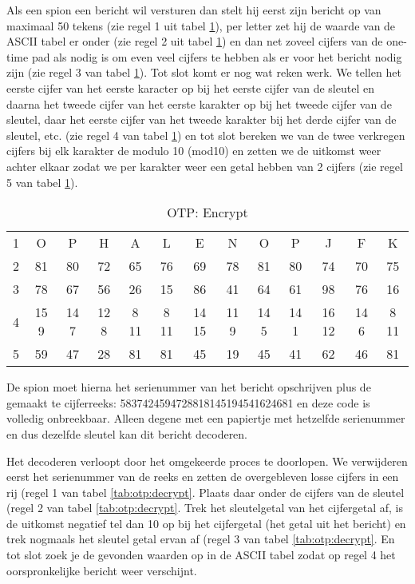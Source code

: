 Als een spion een bericht wil versturen dan stelt hij eerst zijn bericht op van maximaal 50 tekens (zie regel 1 uit tabel \ref{tab:otp:encrypt}), per letter zet hij de waarde van de ASCII tabel er onder (zie regel 2 uit tabel \ref{tab:otp:encrypt}) en dan net zoveel cijfers van de one-time pad als nodig is om even veel cijfers te hebben als er voor het bericht nodig zijn (zie regel 3 van tabel \ref{tab:otp:encrypt}). Tot slot komt er nog wat reken werk. We tellen het eerste cijfer van het eerste karacter op bij het eerste cijfer van de sleutel en daarna het tweede cijfer van het eerste karakter op bij het tweede cijfer van de sleutel, daar het eerste cijfer van het tweede karakter bij het derde cijfer van de sleutel, etc. (zie regel 4 van tabel \ref{tab:otp:encrypt}) en tot slot bereken we van de twee verkregen cijfers bij elk karakter de modulo 10 (mod10) en zetten we de uitkomst weer achter elkaar zodat we per karakter weer een getal hebben van 2 cijfers (zie regel 5 van tabel \ref{tab:otp:encrypt}).

\begin{table}[h!]
\setlength\tabcolsep{1.5pt}
\centering
\begin{tabular}{ | c || c | c | c | c | c | c | c | c | c | c | c | c | }
\hline
	1 & O    & P    & H    & A    & L     & E    & N    & O    & P    & J    & F    & K  \\
	2 & 81   & 80   & 72   & 65   & 76    & 69   & 78   & 81   & 80   & 74   & 70   & 75 \\
	3 & 78   & 67   & 56   & 26   & 15    & 86   & 41   & 64   & 61   & 98   & 76   & 16 \\
	4 & 15 9 & 14 7 & 12 8 & 8 11 & 8 11  & 14 15& 11 9 & 14 5 & 14 1 & 16 12& 14 6 & 8 11 \\
	5 & 59   & 47   & 28   & 81   & 81    & 45   & 19   & 45   & 41   & 62   & 46   & 81 \\
\hline
\end{tabular}
\caption{OTP: Encrypt}
\label{tab:otp:encrypt}
\end{table}

De spion moet hierna het serienummer van het bericht opschrijven plus de gemaakt te cijferreeks: 5837424594728818145194541624681 en deze code is volledig onbreekbaar. Alleen degene met een papiertje met hetzelfde serienummer en dus dezelfde sleutel kan dit bericht decoderen.

Het decoderen verloopt door het omgekeerde proces te doorlopen. We verwijderen eerst het serienummer van de reeks en zetten de overgebleven losse cijfers in een rij (regel 1 van tabel \ref{tab:otp:decrypt}. Plaats daar onder de cijfers van de sleutel (regel 2 van tabel \ref{tab:otp:decrypt}. Trek het sleutelgetal van het cijfergetal af, is de uitkomst negatief tel dan 10 op bij het cijfergetal (het getal uit het bericht) en trek nogmaals het sleutel getal ervan af (regel 3 van tabel \ref{tab:otp:decrypt}. En tot slot zoek je de gevonden waarden op in de ASCII tabel zodat op regel 4 het oorspronkelijke bericht weer verschijnt.

